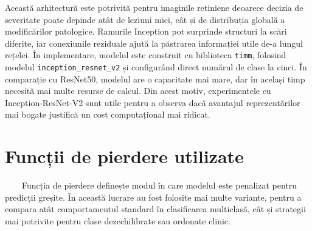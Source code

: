 \documentclass[12pt, a4paper, twoside, romanian]{teza-upb}
\begin{document}
Această arhitectură este potrivită pentru imaginile retiniene deoarece decizia de severitate poate
depinde atât de leziuni mici, cât și de distribuția globală a modificărilor
patologice. Ramurile Inception pot surprinde structuri la scări diferite, iar conexiunile reziduale
ajută la păstrarea informației utile de-a lungul rețelei. În implementare, modelul este
construit cu biblioteca \texttt{timm}, folosind modelul \texttt{inception\_resnet\_v2} și configurând
direct numărul de clase la cinci. În comparație cu ResNet50, modelul are o capacitate
mai mare, dar în același timp necesită mai multe
resurse de calcul. Din acest motiv, experimentele cu Inception-ResNet-V2 sunt utile pentru
a observa dacă avantajul reprezentărilor mai bogate justifică un cost computațional mai ridicat.

\section{Funcții de pierdere utilizate}

\ \ \ \ Funcția de pierdere definește modul în care modelul este penalizat pentru predicții
greșite. În această lucrare au fost folosite mai multe variante, pentru a compara atât
comportamentul standard în clasificarea multiclasă, cât și strategii mai potrivite pentru clase
dezechilibrate sau ordonate clinic.
\end{document}
